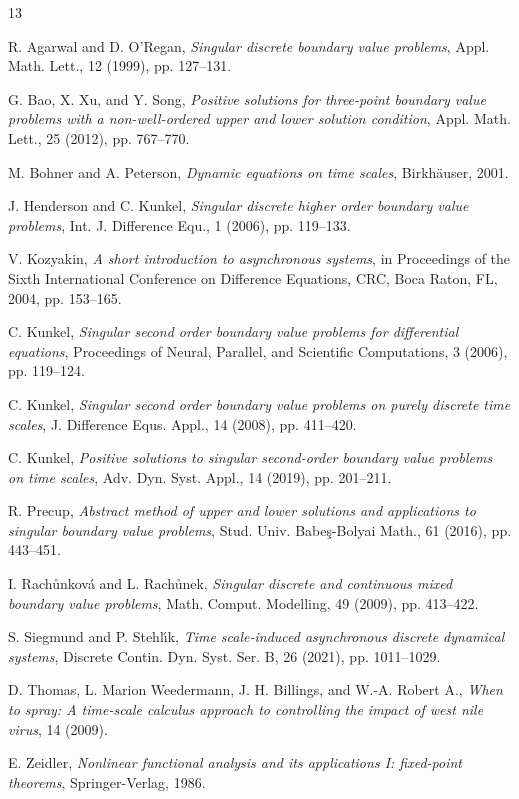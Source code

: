 \documentclass[12pt,reqno]{amsart}
\begin{document}
\begin{thebibliography}{13}

R. Agarwal and D. O'Regan, 
\emph{Singular discrete boundary value problems}, 
Appl. Math. Lett., 12 (1999), pp. 127--131.

G. Bao, X. Xu, and Y. Song, 
\emph{Positive solutions for three-point boundary value problems with a non-well-ordered upper and lower solution condition}, 
Appl. Math. Lett., 25 (2012), pp. 767--770.

M. Bohner and A. Peterson, 
\emph{Dynamic equations on time scales}, 
Birkh\"auser, 2001.

J. Henderson and C. Kunkel, 
\emph{Singular discrete higher order boundary value problems}, 
Int. J. Difference Equ., 1 (2006), pp. 119--133.

V. Kozyakin, 
\emph{A short introduction to asynchronous systems}, 
in Proceedings of the Sixth International Conference on Difference Equations, CRC, Boca Raton, FL, 2004, pp. 153--165.

C. Kunkel, 
\emph{Singular second order boundary value problems for differential equations}, 
Proceedings of Neural, Parallel, and Scientific Computations, 3 (2006), pp. 119--124.

C. Kunkel, 
\emph{Singular second order boundary value problems on purely discrete time scales}, 
J. Difference Equs. Appl., 14 (2008), pp. 411--420.

C. Kunkel, 
\emph{Positive solutions to singular second-order boundary value problems on time scales}, 
Adv. Dyn. Syst. Appl., 14 (2019), pp. 201--211.

R. Precup, 
\emph{Abstract method of upper and lower solutions and applications to singular boundary value problems}, 
Stud. Univ. Babe\c{s}-Bolyai Math., 61 (2016), pp. 443--451.

I. Rach\r{u}nkov\'a and L. Rach\r{u}nek, 
\emph{Singular discrete and continuous mixed boundary value problems}, 
Math. Comput. Modelling, 49 (2009), pp. 413--422.

S. Siegmund and P. Stehl\'{\i}k, 
\emph{Time scale-induced asynchronous discrete dynamical systems}, 
Discrete Contin. Dyn. Syst. Ser. B, 26 (2021), pp. 1011--1029.

D. Thomas, L. Marion Weedermann, J. H. Billings, and W.-A. Robert A., 
\emph{When to spray: A time-scale calculus approach to controlling the impact of west nile virus}, 
14 (2009).

E. Zeidler, 
\emph{Nonlinear functional analysis and its applications I: fixed-point theorems}, 
Springer-Verlag, 1986.

\end{thebibliography}
\end{document}
